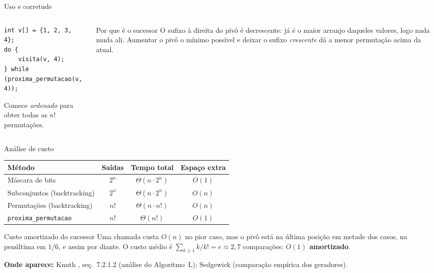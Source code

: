 \documentclass[aspectratio=169]{beamer}
\newcommand{\fonte}[1]{%
  \par\vspace{1pt}%
  {\tiny\color{gray!30!black}\textbf{Onde aparece:} #1\par}}
\begin{document}
\begin{frame}[fragile]{Uso e corretude}
  \begin{columns}[T]
    \begin{column}{0.5\textwidth}
\begin{lstlisting}[style=estiloC]
int v[] = {1, 2, 3, 4};
do {
    visita(v, 4);
} while (proxima_permutacao(v, 4));
\end{lstlisting}
      Comece \emph{ordenado} para obter todas as $n!$ permutações.
    \end{column}
    \begin{column}{0.46\textwidth}
      \begin{block}{Por que é o sucessor}
        O sufixo à direita do pivô é decrescente: já é o maior arranjo daqueles
        valores, logo nada muda ali. Aumentar o pivô o mínimo possível e deixar
        o sufixo \emph{crescente} dá a menor permutação acima da atual.
      \end{block}
    \end{column}
  \end{columns}
\end{frame}

\begin{frame}{Análise de custo}
  \begin{center}
  \begin{tabular}{@{}lccc@{}}
    \toprule
    Método & Saídas & Tempo total & Espaço extra \\
    \midrule
    Máscara de bits            & $2^n$ & $\Theta(n \cdot 2^n)$ & $O(1)$ \\
    Subconjuntos (backtracking)& $2^n$ & $\Theta(n \cdot 2^n)$ & $O(n)$ \\
    Permutações (backtracking) & $n!$  & $\Theta(n \cdot n!)$  & $O(n)$ \\
    \texttt{proxima\_permutacao} & $n!$ & $\Theta(n!)$ & $O(1)$ \\
    \bottomrule
  \end{tabular}
  \end{center}
  \begin{block}{Custo amortizado do sucessor}
    Uma chamada custa $O(n)$ no pior caso, mas o pivô está na última posição em
    metade dos casos, na penúltima em $1/6$, e assim por diante. O custo médio é
    $\sum_{k \ge 1} k/k! = e \approx 2{,}7$ comparações: \textbf{$O(1)$ amortizado}.
  \end{block}
  \fonte{Knuth \cite{knuth2011taocp4a}, seç.~7.2.1.2 (análise do Algoritmo~L);
    Sedgewick \cite{sedgewick1977permutation} (comparação empírica dos geradores).}
\end{frame}
\end{document}
